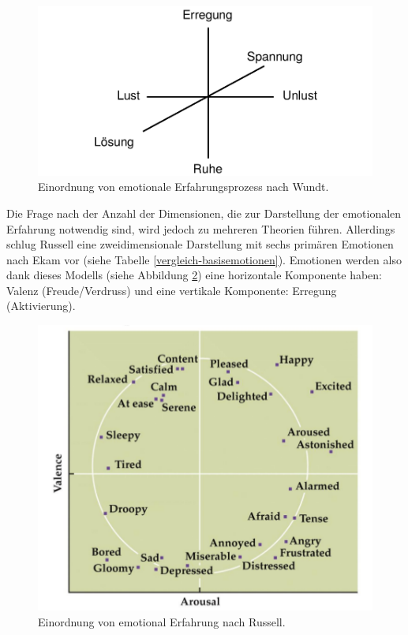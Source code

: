 \begin{figure}[h]
\includegraphics[width=\textwidth]{Images/wundt.png} 
\vspace{-0.3cm} 
\caption[Einordnung von emotionale Erfahrungsprozess nach Wundt.]{ Einordnung von emotionale Erfahrungsprozess nach Wundt\cite{basic_emotions_theories}. }
\label{wundt} 
\end{figure}


Die Frage nach der Anzahl der Dimensionen, die zur Darstellung der emotionalen Erfahrung notwendig sind, wird jedoch zu mehreren Theorien f{\"u}hren. 
Allerdings schlug Russell\cite{basic_emotions_theories} eine zweidimensionale Darstellung mit sechs prim{\"a}ren Emotionen nach Ekam vor (siehe Tabelle \ref{vergleich-basisemotionen}). 
Emotionen werden also dank dieses Modells (siehe Abbildung \ref{russell}) eine horizontale Komponente haben: Valenz (Freude/Verdruss) und eine vertikale Komponente: Erregung (Aktivierung). 


\begin{figure}[h] \centering
\includegraphics[width=12cm]{Images/russell.png} 
\vspace{-0.3cm} 
\caption[Einordnung von emotional Erfahrung nach Russell.]{ Einordnung von emotional Erfahrung nach Russell\cite{basic_emotions_theories}. }
\label{russell} 
\end{figure}


